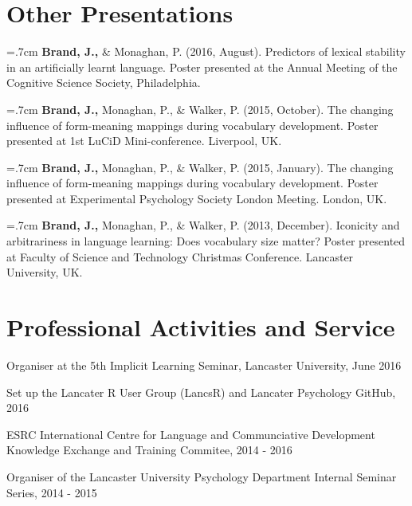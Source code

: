 \documentclass[letterpaper]{article}
\renewenvironment{itemize}{
  \begin{list}{}{
    \setlength{\leftmargin}{1.5em}
  }
}{
  \end{list}
}
\begin{document}
 \singlespacing
\section*{Other Presentations}

\onehalfspacing

\hangindent=.7cm {\bf Brand, J.,} \& Monaghan, P. (2016, August). Predictors of lexical stability in an artificially learnt language. Poster presented at the Annual Meeting of the Cognitive Science Society, Philadelphia.

\hangindent=.7cm {\bf Brand, J.,} Monaghan, P., \& Walker, P. (2015, October). The changing influence of form-meaning mappings during vocabulary development. Poster presented at 1st LuCiD Mini-conference. Liverpool, UK.

\hangindent=.7cm {\bf Brand, J.,} Monaghan, P., \& Walker, P. (2015, January). The changing influence of form-meaning mappings during vocabulary development. Poster presented at Experimental Psychology Society London Meeting. London, UK.

\hangindent=.7cm {\bf Brand, J.,} Monaghan, P., \& Walker, P. (2013, December). Iconicity and arbitrariness in language learning: Does vocabulary size matter? Poster presented at Faculty of Science and Technology Christmas Conference. Lancaster University, UK.


 
 
 \singlespacing

\section*{Professional Activities and Service}
\begin{itemize}
\item Organiser at the 5th Implicit Learning Seminar, Lancaster University, June 2016
\item Set up the Lancater R User Group (LancsR) and Lancater Psychology GitHub, 2016
\item ESRC International Centre for Language and Communciative Development Knowledge Exchange and Training Commitee, 2014 - 2016
\item  Organiser of the Lancaster University Psychology Department Internal Seminar Series, 2014 - 2015
\end{itemize}

\end{document}
